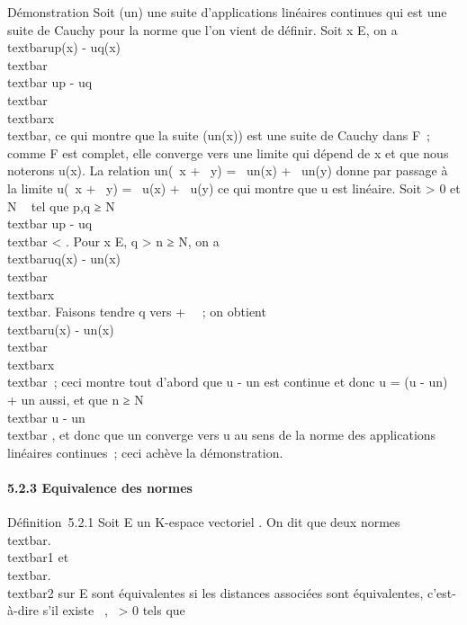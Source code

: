 Démonstration Soit (un) une suite d'applications linéaires
continues qui est une suite de Cauchy pour la norme que l'on vient de
définir. Soit x \in E, on a \\textbar{}up(x) -
uq(x)\\textbar{} \leq\\textbar{}
up -
uq\\textbar{}\,\\textbar{}x\\textbar{},
ce qui montre que la suite (un(x)) est une suite de Cauchy
dans F~; comme F est complet, elle converge vers une limite qui dépend
de x et que nous noterons u(x). La relation un(\alpha~x + \beta~y) =
\alpha~un(x) + \beta~un(y) donne par passage à la limite u(\alpha~x +
\beta~y) = \alpha~u(x) + \beta~u(y) ce qui montre que u est linéaire. Soit \epsilon
\textgreater{} 0 et N \in {}~ tel que p,q ≥ N \rigtharrow~\\textbar{}
up - uq\\textbar{} \textless{} \epsilon.
Pour x \in E, q \textgreater{} n ≥ N, on a
\\textbar{}uq(x) -
un(x)\\textbar{} \leq
\epsilon\\textbar{}x\\textbar{}. Faisons tendre q
vers + \infty~~; on obtient \\textbar{}u(x) -
un(x)\\textbar{} \leq
\epsilon\\textbar{}x\\textbar{}~; ceci montre
tout d'abord que u - un est continue et donc u = (u -
un) + un aussi, et que n ≥ N
\rigtharrow~\\textbar{} u - un\\textbar{} \leq
\epsilon, et donc que un converge vers u au sens de la norme des
applications linéaires continues~; ceci achève la démonstration.

\paragraph{5.2.3 Equivalence des normes}

Définition~5.2.1 Soit E un K-espace vectoriel . On dit que deux normes
\\textbar{}.\\textbar{}1 et
\\textbar{}.\\textbar{}2 sur E
sont équivalentes si les distances associées sont équivalentes,
c'est-à-dire s'il existe \alpha~,\beta~ \textgreater{} 0 tels que


